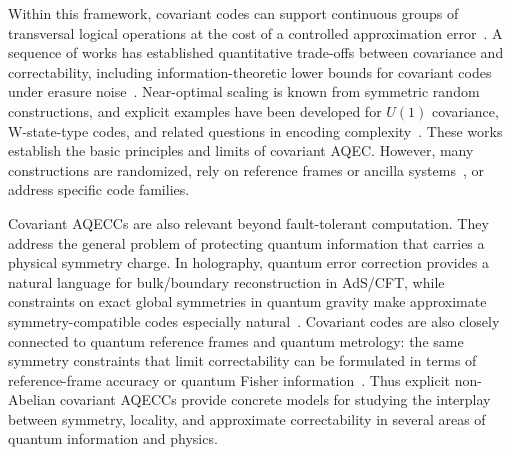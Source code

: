 \documentclass[10pt,twocolumn,superscriptaddress,aps,amsmath,amssymb,citeautoscript,floatfix,prx,longbibliography]{revtex4-2}
\theoremstyle{plain}
\theoremstyle{plain}
\theoremstyle{plain}
\theoremstyle{plain}
\theoremstyle{plain}
\theoremstyle{plain}
\begin{document}
Within this framework, covariant codes can support continuous groups of transversal logical operations at the cost of a controlled approximation error~\cite{Faist2020}. A sequence of works has established quantitative trade-offs between covariance and correctability, including information-theoretic lower bounds for covariant codes under erasure noise~\cite{Faist2020,Zhou2021,Faist2023,Kong2022,Yang2022}. Near-optimal scaling is known from symmetric random constructions, and explicit examples have been developed for $U(1)$ covariance, W-state-type codes, and related questions in encoding complexity~\cite{Lin2025,Faist2020,Alexander2025,Yi2024}. These works establish the basic principles and limits of covariant AQEC. However, many constructions are randomized, rely on reference frames or ancilla systems~\cite{Kong2022,Yang2022}, or address specific code families. 

Covariant AQECCs are also relevant beyond fault-tolerant computation. They address the general problem of protecting quantum information that carries a physical symmetry charge. In holography, quantum error correction provides a natural language for bulk/boundary reconstruction in AdS/CFT, while constraints on exact global symmetries in quantum gravity make approximate symmetry-compatible codes especially natural~\cite{Almheiri2015,Pastawski2015,HarlowOoguri2019}. Covariant codes are also closely connected to quantum reference frames and quantum metrology: the same symmetry constraints that limit correctability can be formulated in terms of reference-frame accuracy or quantum Fisher information~\cite{Hayden2021,Woods2020,Kubica2021}. Thus explicit non-Abelian covariant AQECCs provide concrete models for studying the interplay between symmetry, locality, and approximate correctability in several areas of quantum information and physics.
\end{document}
